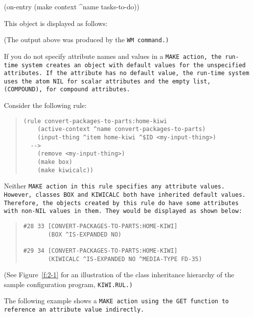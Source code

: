 \begin{qv}
(on-entry
    (make context ^name tasks-to-do))
\end{qv} 

This object is displayed as follows:


(The output above was produced by the \tt{WM} command.)

If you do not specify attribute names and values in a \tt{MAKE}
action, the run-time system creates an object with default values for
the unspecified attributes. If the attribute has no default value, the
run-time system uses the atom \tt{NIL} for scalar attributes and the
empty list, \tt{(COMPOUND)}, for compound attributes.

Consider the following rule:

\begin{quote}
\begin{verbatim}
(rule convert-packages-to-parts:home-kiwi
    (active-context ^name convert-packages-to-parts)
    (input-thing ^item home-kiwi ^$ID <my-input-thing>)
  -->
    (remove <my-input-thing>)
    (make box)
    (make kiwicalc))
\end{verbatim}
\end{quote}

Neither \tt{MAKE} action in this rule specifies any attribute
values. However, classes \tt{BOX} and \tt{KIWICALC} both have
inherited default values.  Therefore, the objects created by this rule
do have some attributes with non-\tt{NIL} values in them. They would
be displayed as shown below:

\begin{quote}
\begin{verbatim}
#28 33 [CONVERT-PACKAGES-TO-PARTS:HOME-KIWI]
       (BOX ^IS-EXPANDED NO)

#29 34 [CONVERT-PACKAGES-TO-PARTS:HOME-KIWI]
       (KIWICALC ^IS-EXPANDED NO ^MEDIA-TYPE FD-35)
\end{verbatim}
\end{quote}

(See Figure~\ref{f:2-1} for an illustration of the class inheritance
hierarchy of the sample configuration program, \tt{KIWI.RUL}.)

The following example shows a \tt{MAKE} action using the \tt{GET}
function to reference an attribute value indirectly.

